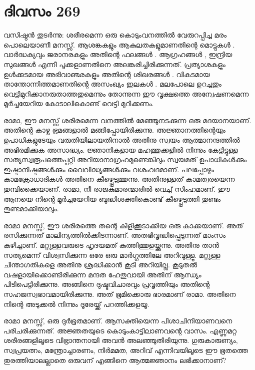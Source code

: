 \section{ദിവസം 269}


വസിഷ്ഠന്‍ തുടര്‍ന്നു: ശരീരമെന്ന ഒരു കൊടുംവനത്തില്‍ വേരുറപ്പിച്ച മരം പൊലെയാണീ മനസ്സ്. ആശങ്കകളും ആകുലതകളുമാണതിന്റെ മൊട്ടുകള്‍ . വാര്‍ദ്ധക്യവും ജരാനരകളും അതിന്റെ ഫലങ്ങള്‍ .   ആഗ്രഹങ്ങള്‍ , ഇന്ദ്രിയ സുഖങ്ങള്‍ എന്നീ പൂക്കളാണതിനെ അലങ്കരിച്ചിരിക്കുന്നത്. പ്രത്യാശകളും ഉള്‍ക്കടമായ അഭിവാഞ്ഛകളും അതിന്റെ ശിഖരങ്ങള്‍ . വികടമായ താന്തോന്നിത്തമാണതിന്റെ അസംഖ്യം ഇലകള്‍ . മലപോലെ ഉറച്ചതും വെട്ടിമുറിക്കാനരുതാത്തതുമെന്നും തോന്നുന്ന ഈ വൃക്ഷത്തെ  അന്വേഷണമെന്ന മൂര്‍ച്ചയേറിയ കോടാലികൊണ്ട് വെട്ടി മുറിക്കണം.

രാമാ, ഈ മനസ്സ് ശരീരമെന്ന വനത്തില്‍ മേഞ്ഞുനടക്കുന്ന ഒരു മദയാനയാണ്. അതിന്റെ കാഴ്ച ഭ്രമങ്ങളാല്‍ മങ്ങിപ്പോയിരിക്കുന്നു. അജ്ഞാനത്തിന്റെയും ഉപാധികളുടേയും വരുതിയിലായതിനാല്‍ അതിനു സ്വയം ആത്മാനന്ദത്തില്‍ അഭിരമിക്കുക അസാദ്ധ്യം. ജ്ഞാനികളായ മഹത്തുക്കളില്‍ നിന്നും കേട്ടിട്ടുള്ള സത്യസ്വരൂപത്തെപ്പറ്റി അറിയാനാഗ്രഹമുണ്ടെങ്കിലും സ്വയമത് ഉപാധികള്‍ക്കും ഇഷ്ടാനിഷ്ടങ്ങള്‍ക്കും വൈവിദ്ധ്യങ്ങള്‍ക്കും വശംവദമാണ്. പലപ്പോഴും കാമക്രോധാദികള്‍ അതിനെ കീഴ്പ്പെടുത്തുന്നു. അതിനുള്ളത് കാമത്വരയെന്ന തുമ്പിക്കൈയാണ്. രാമാ, നീ രാജകുമാരന്മാരില്‍ വെച്ച് സിംഹമാണ്. ഈ ആനയെ നിന്റെ മൂര്‍ച്ചയേറിയ ബുദ്ധിശക്തികൊണ്ട് കീഴ്പ്പെടുത്തി തുണ്ടം തുണ്ടമാക്കിയാലും.

രാമാ മനസ്സ്, ഈ ശരീരത്തെ തന്റെ കിളിക്കൂടാക്കിയ ഒരു കാക്കയാണ്. അത് രസിക്കുന്നത് മാലിന്യത്തില്‍ക്കിടന്നാണ്. അതഭിവൃദ്ധിപ്പെടുന്നത് മാംസം കഴിച്ചാണ്. മറ്റുള്ളവരുടെ ഹൃദയമത് കുത്തിത്തുളയ്ക്കുന്നു. അതിനു താന്‍ സത്യമെന്ന് വിശ്വസിക്കുന്ന ഒരേ ഒരു മാര്‍ഗ്ഗത്തിലേ അറിവുള്ളൂ. മറ്റുള്ള ചിന്താഗതികളെ അതിനു ശ്രദ്ധിക്കാന്‍ കൂടി അറിയില്ല. കൂടുതല്‍ വഷളായിക്കൊണ്ടിരിക്കുന്ന മന്ദത ഹേതുവായി അതിന് ആന്ധ്യം പിടിപെട്ടിരിക്കുന്നു. അങ്ങിനെ ദുഷ്ടവിചാരവും പ്രവൃത്തിയും അതിന്റെ സഹജസ്വഭാവമായിരിക്കുന്നു. അത് ഭൂമിക്കൊരു ഭാരമാണ് രാമാ. അതിനെ നിന്റെ അടുക്കല്‍ നിന്നും ദൂരേയ്ക്ക് പറത്തിക്കളയൂ.

രാമാ മനസ്സ്, ഒരു ദുര്‍ഭൂതമാണ്. ആസക്തിയെന്ന പിശാചിനിയാണവനെ പരിചരിക്കുന്നത്. അജ്ഞതയുടെ കൊടുംകാട്ടിലാണവന്റെ വാസം. എണ്ണമറ്റ ശരീരങ്ങളിലൂടെ വിഭ്രാന്തനായി അവന്‍ അലഞ്ഞുതിരിയുന്നു. ഗുരുകാരുണ്യം, സ്വപ്രയത്നം, മന്ത്രോച്ചാരണം, നിര്‍മമത, അറിവ് എന്നിവയിലൂടെ ഈ ഭൂതത്തെ തുരത്തിയാലല്ലാതെ ഒരുവന് എങ്ങിനെ ആത്മജ്ഞാനം ലഭിക്കാനാണ്? 

